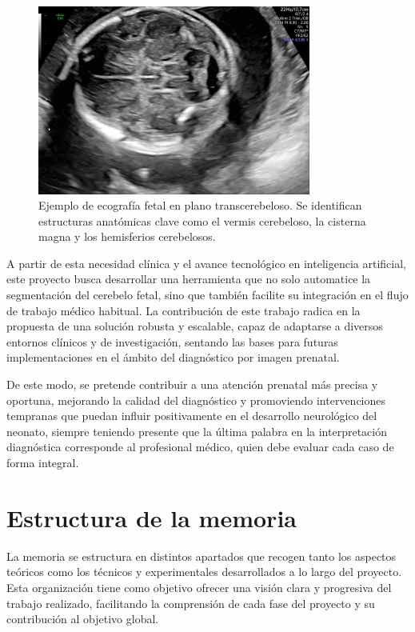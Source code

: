 \begin{figure}[h] \centering \includegraphics[width= 0.8\textwidth]{img/imagen_cerebelo.jpg} \caption{Ejemplo de ecografía fetal en plano transcerebeloso. Se identifican estructuras anatómicas clave como el vermis cerebeloso, la cisterna magna y los hemisferios cerebelosos.} \label{fig:eco_transcerebeloso} \end{figure} 

A partir de esta necesidad clínica y el avance tecnológico en inteligencia artificial, este proyecto busca desarrollar una herramienta que no solo automatice la segmentación del cerebelo fetal, sino que también facilite su integración en el flujo de trabajo médico habitual. La contribución de este trabajo radica en la propuesta de una solución robusta y escalable, capaz de adaptarse a diversos entornos clínicos y de investigación, sentando las bases para futuras implementaciones en el ámbito del diagnóstico por imagen prenatal. 

De este modo, se pretende contribuir a una atención prenatal más precisa y oportuna, mejorando la calidad del diagnóstico y promoviendo intervenciones tempranas que puedan influir positivamente en el desarrollo neurológico del neonato, siempre teniendo presente que la última palabra en la interpretación diagnóstica corresponde al profesional médico, quien debe evaluar cada caso de forma integral.


\section{Estructura de la memoria}

La memoria se estructura en distintos apartados que recogen tanto los aspectos teóricos como los técnicos y experimentales desarrollados a lo largo del proyecto. Esta organización tiene como objetivo ofrecer una visión clara y progresiva del trabajo realizado, facilitando la comprensión de cada fase del proyecto y su contribución al objetivo global.

